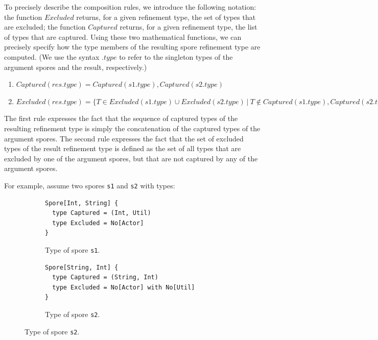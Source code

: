 \documentclass[runningheads]{llncs}
\begin{document}
\begin{sloppypar}
To precisely describe the composition rules, we introduce the following
notation: the function $Excluded$ returns, for a given refinement type, the
set of types that are excluded; the function $Captured$ returns, for a given
refinement type, the list of types that are captured. Using these two
mathematical functions, we can precisely specify how the type members of the
resulting spore refinement type are computed. (We use the syntax $.type$
to refer to the singleton types of the argument spores and the result,
respectively.)

\begin{enumerate}

\item $Captured(res.type) = Captured(s1.type), Captured(s2.type)$

\item $Excluded(res.type) = \{ T \in Excluded(s1.type) \cup Excluded(s2.type) ~|~ T \notin Captured(s1.type), Captured(s2.type) \}$

\end{enumerate}

The first rule expresses the fact that the sequence of captured types of the resulting refinement type is simply the concatenation of the captured types of the argument spores. The second rule expresses the fact that the set of excluded types of the result refinement type is defined as the set of all types that are excluded by one of the argument spores, but that are not captured by any of the argument spores.

For example, assume two spores \verb|s1| and \verb|s2| with types:

\begin{figure}[h!]
\vspace{0.5mm}
\begin{subfigure}{.5\textwidth}
  \centering
  \begin{lstlisting}
Spore[Int, String] {
  type Captured = (Int, Util)
  type Excluded = No[Actor]
}
  \end{lstlisting}
  \vspace{-4mm}
  \caption{Type of spore \texttt{s1}.}
\end{subfigure}%
\begin{subfigure}{.5\textwidth}
  \centering
  \begin{lstlisting}
Spore[String, Int] {
  type Captured = (String, Int)
  type Excluded = No[Actor] with No[Util]
}
  \end{lstlisting}
  \vspace{-4mm}
  \caption{Type of spore \texttt{s2}.}
\end{subfigure}%
\label{fig:spore-composition}
\vspace{0.5mm}
\end{figure}


\end{sloppypar}
\end{document}
